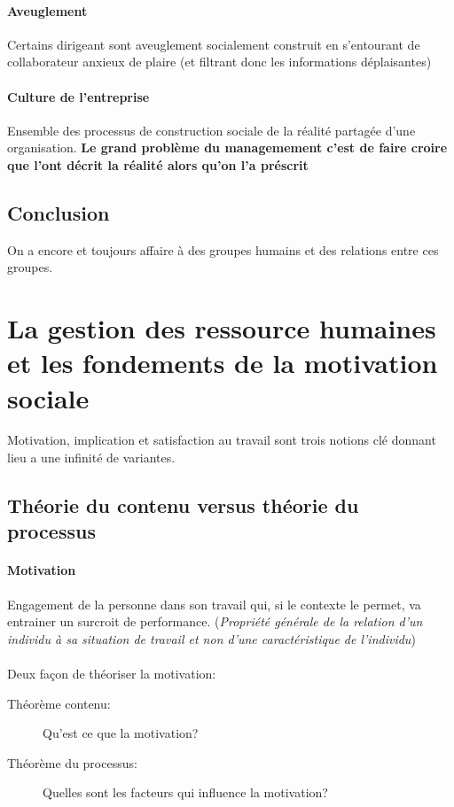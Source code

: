 \documentclass[11pt]{article} %
\begin{document}
\paragraph{Aveuglement}
Certains dirigeant sont aveuglement socialement construit en s'entourant
de collaborateur anxieux de plaire (et filtrant donc les informations
déplaisantes)

\paragraph{Culture de l'entreprise} Ensemble des processus de
construction sociale de la réalité partagée d'une organisation.
\textbf{Le grand problème du managemement c'est de faire croire que
l'ont décrit la réalité alors qu'on l'a préscrit}


\subsection{Conclusion}
On a encore et toujours affaire à des groupes humains et des relations
entre ces groupes.


\section{La gestion des ressource humaines et les fondements de la motivation sociale}

Motivation, implication et satisfaction au travail sont trois notions
clé donnant lieu a une infinité de variantes.

\subsection{Théorie du contenu versus théorie du processus}

\paragraph{Motivation} Engagement de la personne dans son travail qui,
si le contexte le permet, va entrainer un surcroit de performance.
(\textit{Propriété générale de la relation d'un individu à sa situation
de travail et non d'une caractéristique de l'individu})

\paragraph{ }
Deux façon de théoriser la motivation:
\begin{description}
	\item[Théorème contenu: ] Qu'est ce que la motivation?
	\item[Théorème du processus: ] Quelles sont les facteurs qui influence la motivation?
\end{description}
\end{document}
